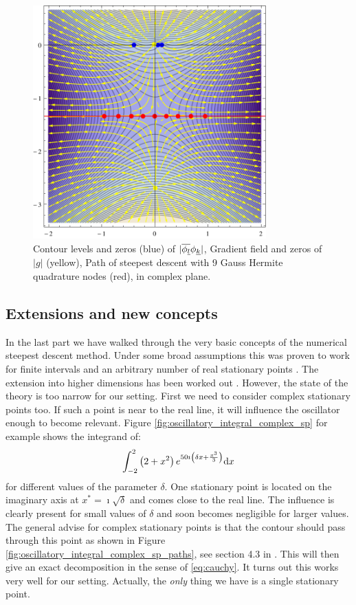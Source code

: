 \documentclass[a4paper,10pt]{article}
\begin{document}
\begin{figure}[h!]
  \centering
  \includegraphics[width=0.8\textwidth]{./fig/stationary_point_example.pdf}
  \caption{Contour levels and zeros (blue) of $|\overline{\phi_{\underline{l}}} \phi_{\underline{k}}|$,
  Gradient field and zeros of $|g|$ (yellow), Path of steepest descent with 9 Gauss Hermite
  quadrature nodes (red), in complex plane.}
  \label{fig:hawp_trafo_example}
\end{figure}


\subsection{Extensions and new concepts}


In the last part we have walked through the very basic concepts of the numerical steepest
descent method. Under some broad assumptions this was proven to work for finite intervals
and an arbitrary number of real stationary points \cite{HV_hoq}. The extension into higher
dimensions has been worked out \cite{HV_cub}.
However, the state of the theory is too narrow for our setting. First we need to consider
complex stationary points too. If such a point is near to the real line, it will influence
the oscillator enough to become relevant. Figure \ref{fig:oscillatory_integral_complex_sp}
for example shows the integrand of:
\begin{equation} \label{eq:nsd_csp_integral_example}
  \int_{-2}^{2} \left(2+x^2\right) e^{50 \imath \left(\delta x + \frac{x^3}{3}\right)} \mathrm{d}x
\end{equation}
for different values of the parameter $\delta$. One stationary point is located on the imaginary axis
at $x^{*} = \imath \sqrt{\delta}$ and comes close to the real line. The influence is clearly present
for small values of $\delta$ and soon becomes negligible for larger values.
The general advise for complex stationary points is that the contour should pass through
this point as shown in Figure \ref{fig:oscillatory_integral_complex_sp_paths},
see section 4.3 in \cite{HV_hoq}. This will then give an exact
decomposition in the sense of \eqref{eq:cauchy}. It turns out this works very well for our setting.
Actually, the \emph{only} thing we have is a single stationary point.
\end{document}
